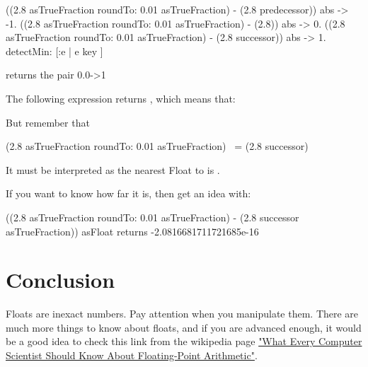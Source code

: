 \documentclass[a4paper,10pt,twoside]{book}
\begin{document}
\begin{code}{}
{
((2.8 asTrueFraction roundTo: 0.01 asTrueFraction) - (2.8 predecessor)) abs -> -1.
((2.8 asTrueFraction roundTo: 0.01 asTrueFraction) - (2.8)) abs -> 0.
((2.8 asTrueFraction roundTo: 0.01 asTrueFraction) - (2.8 successor)) abs -> 1.
} detectMin: [:e | e key ]

returns the pair
	0.0->1
\end{code}

The following expression returns , which means that:

But remember that 

\begin{code}{}
(2.8 asTrueFraction roundTo: 0.01 asTrueFraction) ~= (2.8 successor)
\end{code}

It must be interpreted as the nearest Float to  is .

If you want to know how far it is, then get an idea with:

\begin{code}{}
((2.8 asTrueFraction roundTo: 0.01 asTrueFraction) - (2.8 successor asTrueFraction)) asFloat
	returns -2.0816681711721685e-16
\end{code}



\section{Conclusion}
Floats are inexact numbers. Pay attention when you manipulate them.
There are much more things to know about floats, and if you are advanced enough, it would be a good idea to check this link from the wikipedia page \href{http://www.validlab.com/goldberg/paper.pdf}{"What Every Computer Scientist Should Know About Floating-Point Arithmetic"}.


\ifx\wholebook\relax\else
   
   
\end{document}
